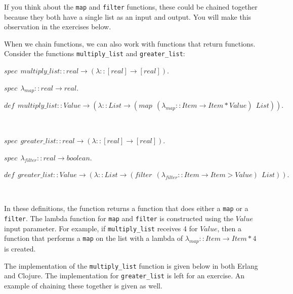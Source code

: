 \documentclass[
]{book}
\begin{document}
If you think about the \texttt{map} and \texttt{filter} functions, these could be chained together because they both have a single list as an input and output. You will make this observation in the exercises below.

When we chain functions, we can also work with functions that return functions. Consider the functions \texttt{multiply\_list} and \texttt{greater\_list}:

\begin{formulabox}
\(spec ~ ~ multiply\_list :: real \rightarrow (\lambda :: [real] \rightarrow [real]).\)

\(spec ~ ~ \lambda_{map} :: real \rightarrow real.\)

\(de\mathit{f} ~ ~ multiply\_list :: Value \rightarrow (\lambda :: List \rightarrow (map ~ ~ (\lambda_{map} :: Item \rightarrow Item * Value) ~ ~ List)).\)

\end{formulabox}

\(\nonumber\)

\begin{formulabox}
\(spec ~ ~ greater\_list :: real \rightarrow (\lambda :: [real] \rightarrow [real]).\)

\(spec ~ ~ \lambda_{filter} :: real \rightarrow boolean.\)

\(de\mathit{f} ~ ~ greater\_list :: Value \rightarrow (\lambda :: List \rightarrow (\mathit{filter} ~ ~ (\lambda_{filter} :: Item \rightarrow Item > Value) ~ ~ List)).\)

\end{formulabox}

\(\nonumber\)

In these definitions, the function returns a function that does either a \texttt{map} or a \texttt{filter}. The lambda function for \texttt{map} and \texttt{filter} is constructed using the \(Value\) input parameter. For example, if \texttt{multiply\_list} receives 4 for \(Value\), then a function that performs a \texttt{map} on the list with a lambda of \(\lambda_{map} :: Item \rightarrow Item * 4\) is created.

The implementation of the \texttt{multiply\_list} function is given below in both Erlang and Clojure. The implementation for \texttt{greater\_list} is left for an exercise. An example of chaining these together is given as well.
\end{document}
